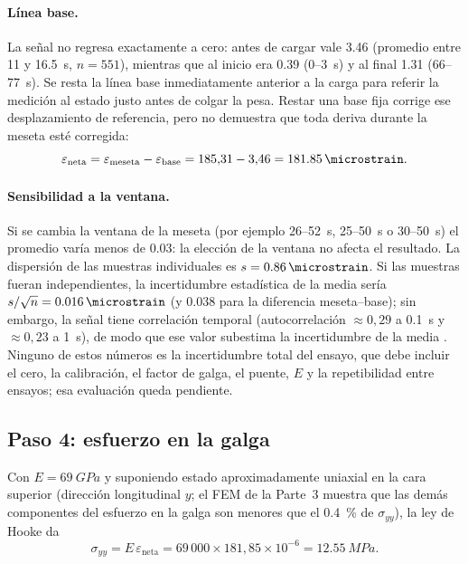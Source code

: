 \documentclass[11pt,a4paper]{article}
\begin{document}
\paragraph{L\'inea base.} La se\~nal no regresa exactamente a cero: antes de cargar vale \SI{3,46}{\microstrain} (promedio entre 11 y \SI{16,5}{s}, $n=551$), mientras que al inicio era \SI{0,39}{\microstrain} (0--3~s) y al final \SI{1,31}{\microstrain} (66--77~s). Se resta la l\'inea base inmediatamente anterior a la carga para referir la medici\'on al estado justo antes de colgar la pesa. Restar una base fija corrige ese desplazamiento de referencia, pero no demuestra que toda deriva durante la meseta est\'e corregida:
\begin{equation}
\varepsilon_{\text{neta}}=\varepsilon_{\text{meseta}}-\varepsilon_{\text{base}}=185{,}31-3{,}46=\SI{181,85}{\microstrain}.
\end{equation}

\paragraph{Sensibilidad a la ventana.} Si se cambia la ventana de la meseta (por ejemplo 26--52~s, 25--50~s o 30--50~s) el promedio var\'ia menos de \SI{0,03}{\microstrain}: la elecci\'on de la ventana no afecta el resultado. La dispersi\'on de las muestras individuales es $s=\SI{0,86}{\microstrain}$. Si las muestras fueran independientes, la incertidumbre estad\'istica de la media ser\'ia $s/\sqrt{n}=\SI{0,016}{\microstrain}$ (y \SI{0,038}{\microstrain} para la diferencia meseta--base); sin embargo, la se\~nal tiene correlaci\'on temporal (autocorrelaci\'on $\approx0{,}29$ a \SI{0,1}{s} y $\approx0{,}23$ a \SI{1}{s}), de modo que ese valor subestima la incertidumbre de la media \cite{gum}. Ninguno de estos n\'umeros es la incertidumbre total del ensayo, que debe incluir el cero, la calibraci\'on, el factor de galga, el puente, $E$ y la repetibilidad entre ensayos; esa evaluaci\'on queda pendiente.

\subsection{Paso 4: esfuerzo en la galga}
Con $E=\SI{69}{GPa}$ y suponiendo estado aproximadamente uniaxial en la cara superior (direcci\'on longitudinal $y$; el FEM de la Parte~3 muestra que las dem\'as componentes del esfuerzo en la galga son menores que el \SI{0,4}{\percent} de $\sigma_{yy}$), la ley de Hooke da
\begin{equation}
\sigma_{yy}=E\,\varepsilon_{\text{neta}}=69\,000\times181{,}85\times10^{-6}=\SI{12,55}{MPa}.
\end{equation}
\end{document}
